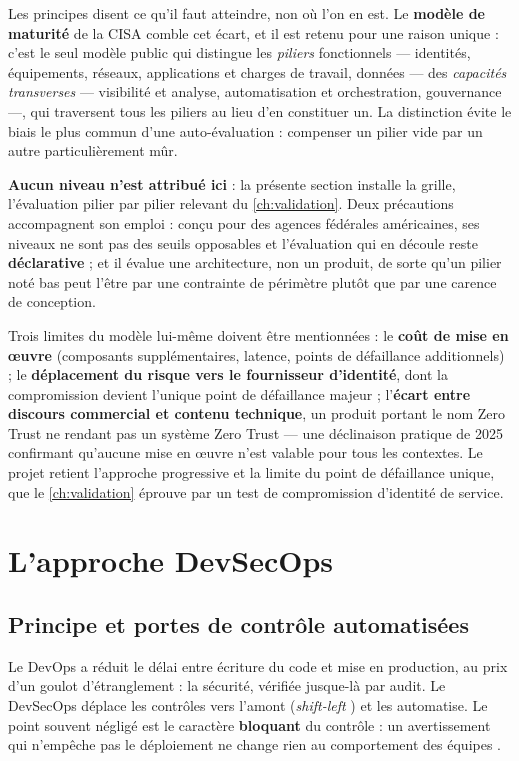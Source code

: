 Les principes disent ce qu'il faut atteindre, non où l'on en est. Le \textbf{modèle de maturité}
de la CISA \cite{cisa_zt_maturity_model} comble cet écart, et il est retenu pour une raison
unique : c'est le seul modèle public qui distingue les \emph{piliers}
fonctionnels --- identités, équipements, réseaux, applications et charges de travail, données ---
des \emph{capacités transverses} --- visibilité et analyse, automatisation et orchestration,
gouvernance ---, qui traversent tous les piliers au lieu d'en constituer un. La distinction évite
le biais le plus commun d'une auto-évaluation : compenser un pilier vide par un autre
particulièrement mûr.

\textbf{Aucun niveau n'est attribué ici} : la présente section installe la grille, l'évaluation
pilier par pilier relevant du \cref{ch:validation}. Deux précautions accompagnent son emploi :
conçu pour des agences fédérales américaines, ses niveaux ne sont pas des seuils opposables et
l'évaluation qui en découle reste \textbf{déclarative} ; et il évalue une architecture, non un
produit, de sorte qu'un pilier noté bas peut l'être par une contrainte de périmètre plutôt que
par une carence de conception.

Trois limites du modèle lui-même doivent être mentionnées : le \textbf{coût de mise en œuvre}
(composants supplémentaires, latence, points de défaillance additionnels) ; le \textbf{déplacement
du risque vers le fournisseur d'identité}, dont la compromission devient l'unique point de
défaillance majeur ; l'\textbf{écart entre discours commercial et contenu technique}, un produit
portant le nom \og Zero Trust \fg{} ne rendant pas un système Zero Trust --- une déclinaison
pratique de 2025 \cite{nist180035} confirmant qu'aucune mise en œuvre n'est valable pour tous les
contextes. Le projet retient l'approche progressive et la limite du point de défaillance unique,
que le \cref{ch:validation} éprouve par un test de compromission d'identité de service.

\section{L'approche DevSecOps}
\label{sec:devsecops}

\subsection{Principe et portes de contrôle automatisées}
\label{sec:devsecops-portes}

Le DevOps a réduit le délai entre écriture du code et mise en production, au prix d'un goulot
d'étranglement : la sécurité, vérifiée jusque-là par audit. Le DevSecOps déplace les contrôles vers
l'amont (\emph{shift-left} \cite{shiftleft_smith2001}) et les automatise. Le point souvent négligé
est le caractère \textbf{bloquant} du contrôle : un avertissement qui n'empêche pas le déploiement
ne change rien au comportement des équipes \cite{owasp_cicd_top10}.


